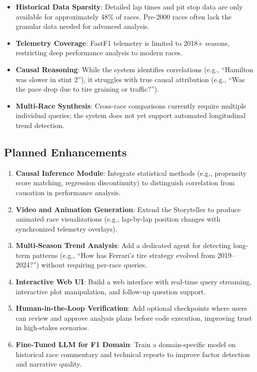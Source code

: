 \documentclass[11pt]{article}
\begin{document}
\begin{itemize}[leftmargin=1.5em]
    \item \textbf{Historical Data Sparsity}: Detailed lap times and pit stop data are only available for approximately 48\% of races. Pre-2000 races often lack the granular data needed for advanced analysis.
    \item \textbf{Telemetry Coverage}: FastF1 telemetry is limited to 2018+ seasons, restricting deep performance analysis to modern races.
    \item \textbf{Causal Reasoning}: While the system identifies correlations (e.g., ``Hamilton was slower in stint 2''), it struggles with true causal attribution (e.g., ``Was the pace drop due to tire graining or traffic?'').
    \item \textbf{Multi-Race Synthesis}: Cross-race comparisons currently require multiple individual queries; the system does not yet support automated longitudinal trend detection.
\end{itemize}

\subsection{Planned Enhancements}

\begin{enumerate}[leftmargin=1.5em]
    \item \textbf{Causal Inference Module}: Integrate statistical methods (e.g., propensity score matching, regression discontinuity) to distinguish correlation from causation in performance analysis.
    \item \textbf{Video and Animation Generation}: Extend the Storyteller to produce animated race visualizations (e.g., lap-by-lap position changes with synchronized telemetry overlays).
    \item \textbf{Multi-Season Trend Analysis}: Add a dedicated agent for detecting long-term patterns (e.g., ``How has Ferrari's tire strategy evolved from 2019--2024?'') without requiring per-race queries.
    \item \textbf{Interactive Web UI}: Build a web interface with real-time query streaming, interactive plot manipulation, and follow-up question support.
    \item \textbf{Human-in-the-Loop Verification}: Add optional checkpoints where users can review and approve analysis plans before code execution, improving trust in high-stakes scenarios.
    \item \textbf{Fine-Tuned LLM for F1 Domain}: Train a domain-specific model on historical race commentary and technical reports to improve factor detection and narrative quality.
\end{enumerate}
\end{document}
